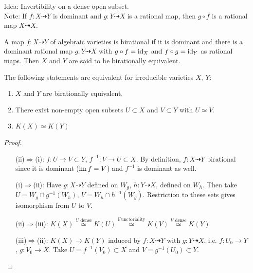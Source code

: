 \documentclass[a4paper,11pt]{article}
\begin{document}
			Idea: Invertibility on a dense open subset. 
			\\

			\noindent Note: If $f:X\dashrightarrow Y$ is dominant and $g:Y\dashrightarrow X$ is  a rational map, then $g\circ f$ is a rational map $X\dashrightarrow X$.

			\begin{defi}
				A map $f:X\dashrightarrow Y$ of algebraic varieties is birational if it is dominant and there is a dominant rational map $g:Y\dashrightarrow X$ with $g\circ f=\operatorname{id}_X$ and $f\circ g=\operatorname{id}_Y$ as rational maps. Then $X$ and $Y$ are said to be birationally equivalent.
			\end{defi}

			\begin{prop}
				The following statements are equivalent for irreducible varieties $X$, $Y$:
				\begin{enumerate}
					\item $X$ and $Y$ are birationally equivalent.
					\item There exist non-empty open subsets $U\subset X$ and $V\subset Y$ with $U\simeq V$.
					\item $K(X)\simeq K(Y)$
				\end{enumerate}
			\end{prop}
			\begin{proof}\phantom{x}
				\begin{enumerate}[leftmargin=5em]
					\item[(ii)$\Rightarrow$(i):] $f:U\rightarrow V\subset Y$, $f^{-1}:V\rightarrow U\subset X$. By definition, $f:X\dashrightarrow Y$ birational since it is dominant ($\operatorname{im} f=V$) and $f^{-1}$ is dominant as well.
					\item[(i)$\Rightarrow$(ii):] Have $g:X\dashrightarrow Y$ defined on $W_g$, $h:Y\dashrightarrow X$, defined on $W_h$. Then take $U=W_g\cap g^{-1}(W_h)$, $V=W_h\cap h^{-1}(W_g)$. Restriction to these sets gives isomorphism from $U$ to $V$. 
					\item[(ii)$\Rightarrow$(iii):] $K(X)\overset{U\text{ dense}}{\simeq} K(U)\overset{\text{Functoriality}}{\simeq} K(V)\overset{V\text{ dense}}{\simeq} K(Y)$
					\item[(iii)$\Rightarrow$(ii):] $K(X)\rightarrow K(Y)$  induced by $f:X\dashrightarrow Y$ with  $g:Y\dashrightarrow X$, i.e. $f:U_0\rightarrow Y$, $g:V_0\rightarrow X$. Take $U=f^{-1}(V_0)\subset X$ and $V=g^{-1}(U_0)\subset Y$.
				\end{enumerate}
			\end{proof}
\end{document}
